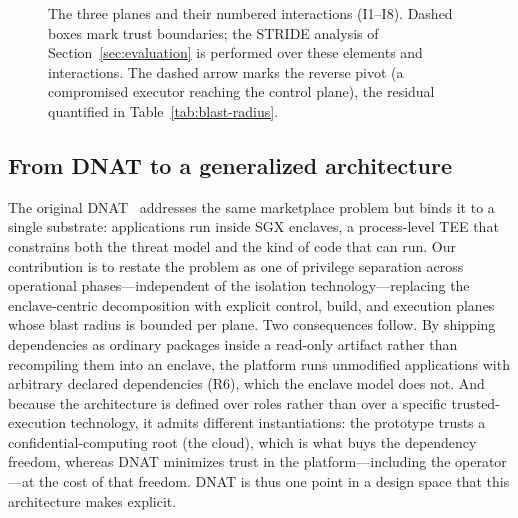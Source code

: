 \documentclass[runningheads]{llncs}
\begin{document}
\begin{figure}[htbp]
\caption{The three planes and their numbered interactions (I1--I8). Dashed
boxes mark trust boundaries; the STRIDE analysis of
Section~\ref{sec:evaluation} is performed over these elements and
interactions. The dashed arrow marks the reverse pivot (a compromised executor
reaching the control plane), the residual quantified in
Table~\ref{tab:blast-radius}.}
\label{fig:architecture}
\end{figure}

\subsection{From DNAT to a generalized architecture}
The original DNAT~\cite{nascimento2020dnat} addresses the same marketplace problem but binds
it to a single substrate: applications run inside SGX enclaves, a process-level TEE that
constrains both the threat model and the kind of code that can run. Our contribution is to
restate the problem as one of privilege separation across operational
phases---independent of the isolation technology---replacing the enclave-centric
decomposition with explicit control, build, and execution planes whose blast radius is
bounded per plane. Two consequences follow. By shipping dependencies as ordinary packages
inside a read-only artifact rather than recompiling them into an enclave, the platform runs
unmodified applications with arbitrary declared dependencies (R6), which the enclave model
does not. And because the architecture is defined over roles rather than over a specific
trusted-execution technology, it admits different instantiations: the prototype trusts a
confidential-computing root (the cloud), which is what buys the dependency freedom, whereas
DNAT minimizes trust in the platform---including the operator---at the cost of that freedom.
DNAT is thus one point in a design space that this architecture makes explicit.
\end{document}
